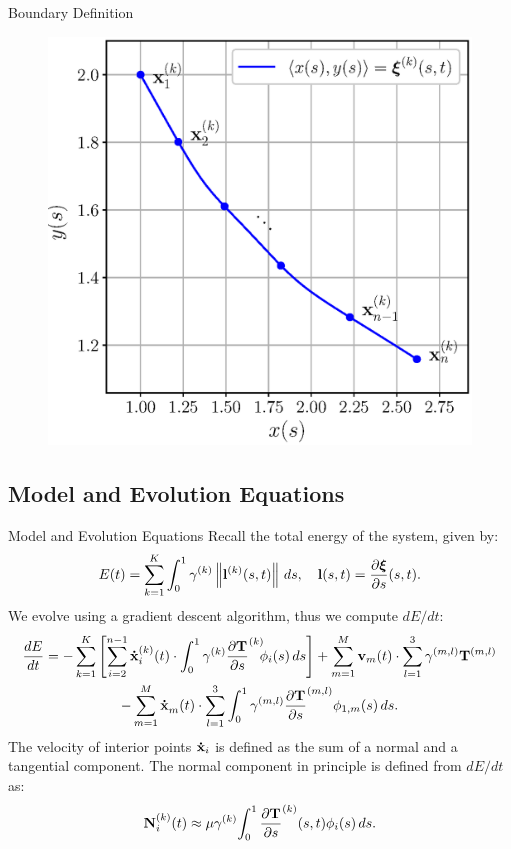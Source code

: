 \documentclass[usenames,dvipsnames]{beamer}
\begin{document}
\begin{frame}{Boundary Definition}
\begin{figure}
\begin{minipage}[t]{0.5\textwidth}
    \includegraphics[scale=0.36,trim={0 0 0 3em},clip=true]{figures/coupled_model/xi.eps}
    \end{minipage}
\end{figure}
\end{frame}


\subsection{Model and Evolution Equations}

\begin{frame}{Model and Evolution Equations}
Recall the total energy of the system, given by:
\begin{equation*}
    E(t) = \sum_{k=1}^K \int_0^1 \gamma^{(k)} \left\lVert\mathbf{l}^{(k)}(s,t)\right\rVert\,ds,\quad \mathbf{l}(s,t) = \frac{\partial \bm{\xi}}{\partial s}(s,t).
\end{equation*}
We evolve using a gradient descent algorithm, thus we compute $dE/dt$:
\vspace{-0.5em}
\small
\begin{multline}
    \frac{dE}{dt} =   -\sum_{k=1}^{K}\left[ \sum_{i=2}^{n-1} \dotx[i][k](t)  \cdot \int_0^1  \gamma^{(k)}\dTds^{(k)}\!\! \phi_i(s)\,ds \right] + \sum_{m=1}^{M} \vel_m(t) \cdot \sum_{l=1}^3 \gamma^{(m,l)}\T^{(m,l)}\\ -\sum_{m=1}^{M} \dotx[m]\,\,(t) \cdot \sum_{l=1}^3 \int_0^1 \gamma^{(m,l)} \dTds^{(m,l)}\phi_{1,m}(s)\,ds.  \label{eq:dEdtcoupled3}
    \end{multline}
\normalsize
The velocity of interior points $\dotx_i$ is defined as the sum of a normal and a tangential component. The normal component in principle is defined from $dE/dt$ as:
\begin{equation}
    \mathbf{N}^{(k)}_{i}(t) \approx \mu \gamma^{(k)}\!\int_0^1  \dfrac{\partial \mathbf{T}}{\partial s}^{(k)} (s,t) \phi_i(s)\,ds.
    \label{eq:incomplete_normalcomponent}
\end{equation}
\end{frame}
\end{document}
